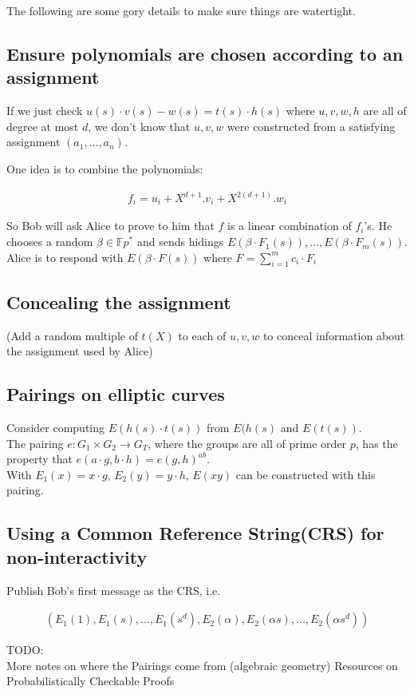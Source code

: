 \documentclass[12pt]{article}
\begin{document}
The following are some gory details to make sure things are watertight.

\subsection*{Ensure polynomials are chosen according to an assignment}

If we just check 
$u(s)\cdot v(s)-w(s) = t(s)\cdot h(s)$
where $u, v, w, h$ are all of degree at most $d$, we 
don't know that $u, v, w$ were constructed from 
a satisfying assignment $(a_1, \dots, a_n)$.

One idea is to combine the polynomials:

\begin{align*}
f_i = u_i + X^{d+1}.v_i + X^{2(d+1)}.w_i
\end{align*}

So Bob will ask Alice to prove to him that $f$ is a linear combination 
of $f_i$'s. He chooses a random $\beta \in \mathbb{F}p^*$ and sends 
hidings $E(\beta\cdot F_1(s)), \dots, E(\beta\cdot F_m(s))$. 
Alice is to respond with $E(\beta\cdot F(s))$ where 
$
F = \sum_{i=1}^m c_i\cdot F_i
$

\subsection*{Concealing the assignment}

(Add a random multiple of $t(X)$ to each of $u, v, w$ to conceal 
information about the assignment used by Alice)


\subsection*{Pairings on elliptic curves}

Consider computing  $E(h(s)\cdot t(s))$ from $E(h(s)$ and $E(t(s))$.\\

The pairing $e: G_1 \times G_2 \rightarrow G_T$, where
the groups are all of prime order $p$, has the property that
$e(a\cdot g, b\cdot h) = e(g, h)^{ab}$.\\

With $E_1(x) = x\cdot g$,
$E_2(y) = y\cdot h$, $E(xy)$ can be constructed with this pairing.

\subsection*{Using a Common Reference String(CRS) for non-interactivity}

Publish Bob's first message as the CRS, i.e.

\begin{align*}
  (E_1(1), E_1(s), \dots, E_1(s^d), E_2(\alpha), E_2(\alpha s), \dots,
  E_2(\alpha s^d))
\end{align*}


TODO: \\
More notes on where the Pairings come from (algebraic geometry)
Resources on Probabilistically Checkable Proofs
\end{document}
